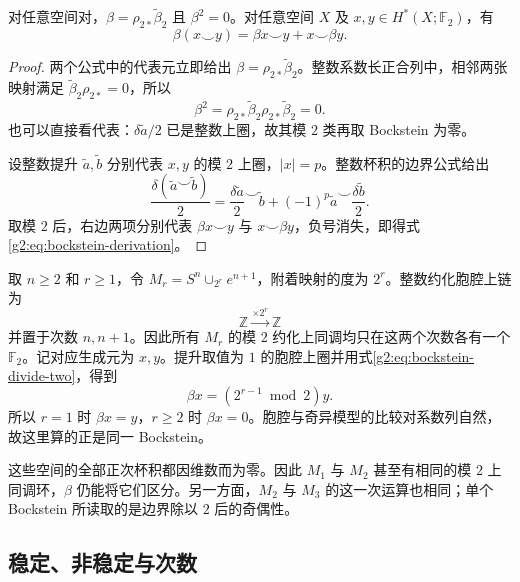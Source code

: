 \begin{proposition}\label{g2:prop:mod-two-bockstein}
	对任意空间对，\(\beta=\rho_{2*}\widetilde\beta_2\) 且 \(\beta^2=0\)。对任意空间 \(X\) 及 \(x,y\in H^*(X;\mathbb F_2)\)，有
	\begin{equation}\label{g2:eq:bockstein-derivation}
		\beta(x\smile y)=\beta x\smile y+x\smile\beta y.
	\end{equation}
\end{proposition}
\begin{proof}
	两个公式中的代表元立即给出 \(\beta=\rho_{2*}\widetilde\beta_2\)。整数系数长正合列中，相邻两张映射满足 \(\widetilde\beta_2\rho_{2*}=0\)，所以
	\[
		\beta^2=\rho_{2*}\widetilde\beta_2\rho_{2*}\widetilde\beta_2=0.
	\]
	也可以直接看代表：\(\delta\widetilde a/2\) 已是整数上圈，故其模 \(2\) 类再取 Bockstein 为零。

	设整数提升 \(\widetilde a,\widetilde b\) 分别代表 \(x,y\) 的模 \(2\) 上圈，\(|x|=p\)。整数杯积的边界公式给出
	\[
		\frac{\delta(\widetilde a\smile\widetilde b)}2
		=\frac{\delta\widetilde a}2\smile\widetilde b+(-1)^p\widetilde a\smile\frac{\delta\widetilde b}2.
	\]
	取模 \(2\) 后，右边两项分别代表 \(\beta x\smile y\) 与 \(x\smile\beta y\)，负号消失，即得式\eqref{g2:eq:bockstein-derivation}。
\end{proof}

\begin{example}\label{g2:exm:moore-bockstein-comparison}
	取 \(n\ge2\) 和 \(r\ge1\)，令 \(M_r=S^n\cup_{2^r}e^{n+1}\)，附着映射的度为 \(2^r\)。整数约化胞腔上链为
	\[
		\mathbb Z\xrightarrow{\times2^r}\mathbb Z
	\]
	并置于次数 \(n,n+1\)。因此所有 \(M_r\) 的模 \(2\) 约化上同调均只在这两个次数各有一个 \(\mathbb F_2\)。记对应生成元为 \(x,y\)。提升取值为 \(1\) 的胞腔上圈并用式\eqref{g2:eq:bockstein-divide-two}，得到
	\[
		\beta x=(2^{r-1}\bmod2)y.
	\]
	所以 \(r=1\) 时 \(\beta x=y\)，\(r\ge2\) 时 \(\beta x=0\)。胞腔与奇异模型的比较对系数列自然，故这里算的正是同一 Bockstein。

	这些空间的全部正次杯积都因维数而为零。因此 \(M_1\) 与 \(M_2\) 甚至有相同的模 \(2\) 上同调环，\(\beta\) 仍能将它们区分。另一方面，\(M_2\) 与 \(M_3\) 的这一次运算也相同；单个 Bockstein 所读取的是边界除以 \(2\) 后的奇偶性。
\end{example}

\subsection{稳定、非稳定与次数}
\label{g2:subsec:1301:02}

